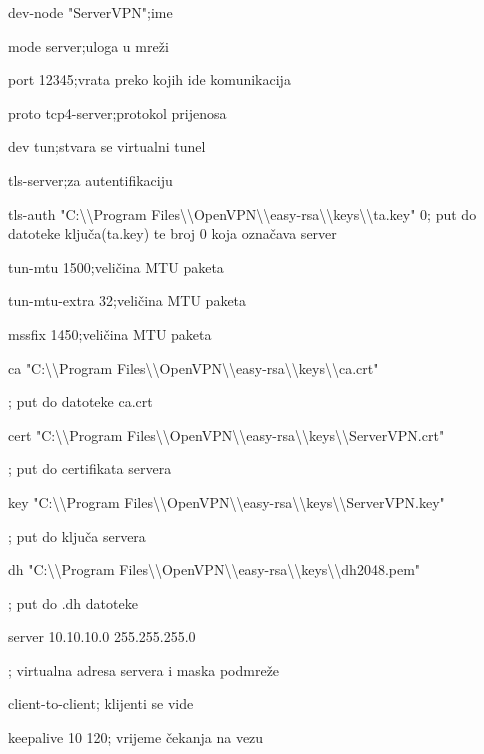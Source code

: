 {\selectfont
dev-node "ServerVPN"\hfill;ime

mode server\hfill;uloga u mreži

port 12345\hfill;vrata preko kojih ide komunikacija	

proto tcp4-server\hfill;protokol prijenosa

dev tun\hfill;stvara se virtualni tunel

tls-server\hfill;za autentifikaciju

tls-auth "C:\textbackslash \textbackslash Program Files\textbackslash \textbackslash OpenVPN\textbackslash \textbackslash easy-rsa\textbackslash \textbackslash keys\textbackslash \textbackslash ta.key" 0\hfill; put do datoteke ključa(ta.key) te broj 0 koja označava server

tun-mtu 1500\hfill;veličina MTU paketa

tun-mtu-extra 32\hfill;veličina MTU paketa

mssfix 1450\hfill;veličina MTU paketa

ca "C:\textbackslash \textbackslash Program Files\textbackslash \textbackslash OpenVPN\textbackslash \textbackslash easy-rsa\textbackslash \textbackslash keys\textbackslash \textbackslash ca.crt"\hfill

; put do datoteke ca.crt

cert "C:\textbackslash \textbackslash Program Files\textbackslash \textbackslash OpenVPN\textbackslash \textbackslash easy-rsa\textbackslash \textbackslash keys\textbackslash \textbackslash ServerVPN.crt"\hfill

; put do certifikata servera

key "C:\textbackslash \textbackslash Program Files\textbackslash \textbackslash OpenVPN\textbackslash \textbackslash easy-rsa\textbackslash \textbackslash keys\textbackslash \textbackslash ServerVPN.key"\hfill

; put do ključa servera

dh "C:\textbackslash \textbackslash Program Files\textbackslash \textbackslash OpenVPN\textbackslash \textbackslash easy-rsa\textbackslash \textbackslash keys\textbackslash \textbackslash dh2048.pem"\hfill

; put do .dh datoteke

server 10.10.10.0 255.255.255.0\hfill

; virtualna adresa servera i maska podmreže

client-to-client\hfill; klijenti se vide

keepalive 10 120\hfill; vrijeme čekanja na vezu

}
